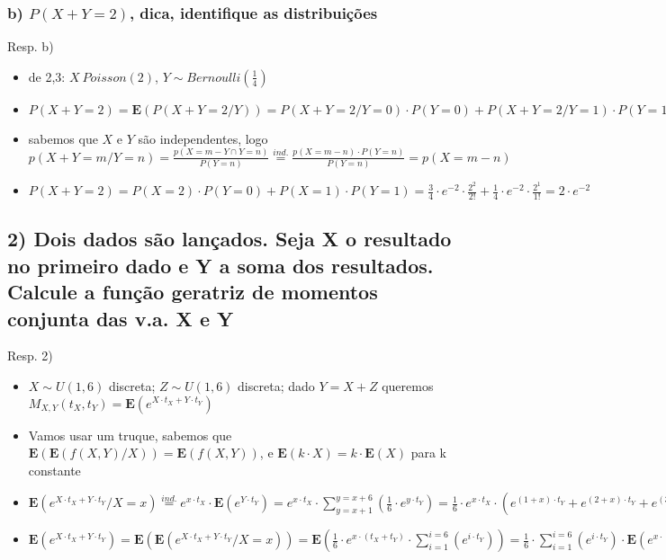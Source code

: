 \documentclass[portuguese]{article}
\begin{document}
\subsubsection*{\textmd{b) $P(X+Y=2)$, dica, identifique as distribuições}}

Resp. b)
\begin{itemize}
\item de 2,3: $X~Poisson(2)$, $Y\sim Bernoulli(\frac{1}{4})$
\item $P(X+Y=2)=\mathbf{E}(P(X+Y=2/Y))=P(X+Y=2/Y=0)\cdot P(Y=0)+P(X+Y=2/Y=1)\cdot P(Y=1)$
\item sabemos que $X$ e $Y$ são independentes, logo $p(X+Y=m/Y=n)=\frac{p(X=m-Y\cap Y=n)}{P(Y=n)}\overset{ind.}{=}\frac{p(X=m-n)\cdot P(Y=n)}{P(Y=n)}=p(X=m-n)$
\item $P(X+Y=2)=P(X=2)\cdot P(Y=0)+P(X=1)\cdot P(Y=1)=\frac{3}{4}\cdot e^{-2}\cdot\frac{2^{2}}{2!}+\frac{1}{4}\cdot e^{-2}\cdot\frac{2^{1}}{1!}=2\cdot e^{-2}$
\end{itemize}

\subsection*{\textcompwordmark{}}


\subsection*{\textmd{2) Dois dados são lançados. Seja X o resultado no primeiro
dado e Y a soma dos resultados. Calcule a função geratriz de momentos
conjunta das v.a. X e Y}}

Resp. 2)
\begin{itemize}
\item $X\sim U(1,6)$ discreta; $Z\sim U(1,6)$ discreta; dado $Y=X+Z$
queremos $M_{X,Y}(t_{X},t_{Y})=\mathbf{E}(e^{X\cdot t_{X}+Y\cdot t_{Y}})$
\item Vamos usar um truque, sabemos que $\mathbf{E}(\mathbf{E}(f(X,Y)/X))=\mathbf{E}(f(X,Y))$,
e $\mathbf{E}(k\cdot X)=k\cdot\mathbf{E}(X)$ para k constante
\item $\mathbf{E}(e^{X\cdot t_{X}+Y\cdot t_{Y}}/X=x)\overset{ind.}{=}e^{x\cdot t_{X}}\cdot\mathbf{E}(e^{Y\cdot t_{Y}})=e^{x\cdot t_{X}}\cdot\sum_{y=x+1}^{y=x+6}(\frac{1}{6}\cdot e^{y\cdot t_{Y}})=\frac{1}{6}\cdot e^{x\cdot t_{X}}\cdot(e^{(1+x)\cdot t_{Y}}+e^{(2+x)\cdot t_{Y}}+e^{(3+x)\cdot t_{Y}}+e^{(4+x)\cdot t_{Y}}+e^{(5+x)\cdot t_{Y}}+e^{(6+x)\cdot t_{Y}})=\frac{1}{6}\cdot e^{x\cdot(t_{X}+t_{Y})}\cdot\sum_{i=1}^{i=6}(e^{i\cdot t_{Y}})$
\item $\mathbf{E}(e^{X\cdot t_{X}+Y\cdot t_{Y}})=\mathbf{E}(\mathbf{E}(e^{X\cdot t_{X}+Y\cdot t_{Y}}/X=x))=\mathbf{E}(\frac{1}{6}\cdot e^{x\cdot(t_{X}+t_{Y})}\cdot\sum_{i=1}^{i=6}(e^{i\cdot t_{Y}}))=\frac{1}{6}\cdot\sum_{i=1}^{i=6}(e^{i\cdot t_{Y}})\cdot\mathbf{E}(e^{x\cdot(t_{X}+t_{Y})})=\frac{1}{6}\cdot\sum_{i=1}^{i=6}(e^{i\cdot t_{Y}})\cdot\sum_{x=1}^{x=6}(e^{x\cdot(t_{X}+t_{Y})})\cdot\frac{1}{6}=\frac{1}{36}\cdot\sum_{i=1}^{i=6}\sum_{x=1}^{x=6}(e^{i\cdot t_{Y}+x\cdot(t_{X}+t_{Y})})$
\end{itemize}
\end{document}
